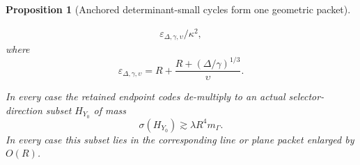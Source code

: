 \documentclass[10pt]{article}
\newtheorem{proposition}[theorem]{Proposition}
\begin{document}
\begin{proposition}[Anchored determinant-small cycles form one geometric packet]
\begin{enumerate}[label=\textnormal{(\roman*)}]
\begin{equation}
{\begin{aligned}
\varepsilon_{\Delta,\gamma,\upsilon}/\kappa^2,
\end{aligned}
}
\end{equation}
where
\begin{equation}
\label{eq:v046-anchored-packet-error}
\varepsilon_{\Delta,\gamma,\upsilon}
=
R+
\frac{R+(\Delta/\gamma)^{1/3}}{\upsilon}.
\end{equation}
\end{enumerate}
In every case the retained endpoint codes de-multiply to an actual selector-direction subset
\(H_{Y_0}\) of mass
\begin{equation}
\label{eq:v046-anchored-packet-mass}
\boxed{
\sigma(H_{Y_0})
\gtrsim
\lambda R^4m_\Gamma.
}
\end{equation}
In every case this subset lies in the corresponding line or plane packet enlarged by \(O(R)\).
\end{proposition}
\end{document}
